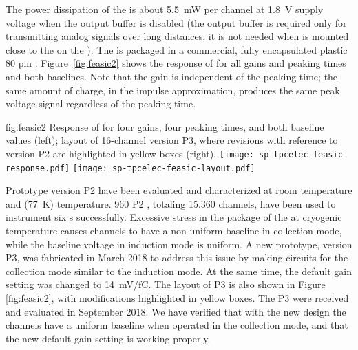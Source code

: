 The power dissipation of the   is about \SI{5.5}{mW} 
per channel at \SI{1.8}{V} supply voltage when the output buffer is
disabled (the output buffer is required only for transmitting analog
signals over long distances; it is not needed when 
is mounted close to the  on the ).
The  is packaged in a commercial, fully encapsulated 
plastic \num{80} pin . Figure~\ref{fig:feasic2} shows the 
response of   for all gains and peaking times 
and both baselines. Note that the gain is independent of the peaking 
time; the same amount of charge, in the impulse approximation, produces 
the same peak voltage signal regardless of the peaking time.

\begin{dunefigure}
{fig:feasic2}
{Response of   for four gains, four peaking times, 
and both baseline values (left); layout of \num{16}-channel  
 version P3, where revisions with reference to version 
P2 are highlighted in yellow boxes (right).}
\texttt{[image: sp-tpcelec-feasic-response.pdf]}
\hspace{6mm}
\texttt{[image: sp-tpcelec-feasic-layout.pdf]}
\end{dunefigure}

Prototype version P2   have been evaluated and 
characterized at room temperature and \lntwo (\SI{77}{K}) temperature. 
\num{960} P2  , totaling \num{15,360} channels, 
have been used to instrument six  s successfully. 
Excessive stress in the package of the   at cryogenic 
temperature causes  channels to have a non-uniform baseline in 
collection mode, while the baseline  voltage in induction mode 
is uniform. A new prototype, version P3, was fabricated in March 2018 
to address this issue by making  circuits for the collection mode 
similar to the induction mode. At the same time, the default gain
setting was changed to \SI{14}{mV/fC}. The layout of P3  
 is also shown in Figure \ref{fig:feasic2}, with modifications 
highlighted in yellow boxes. The P3   were 
received and evaluated in September 2018. We have verified that with
the new design the  channels have a uniform baseline when
operated in the collection mode, and that the new default gain setting
is working properly.

